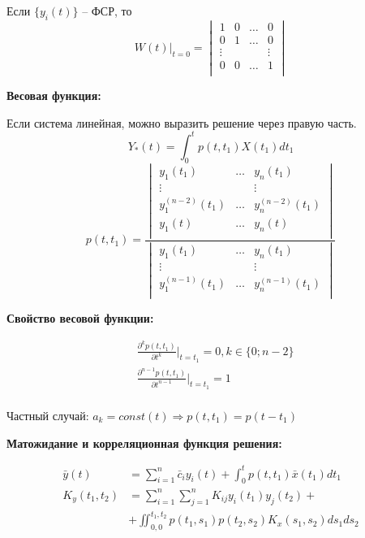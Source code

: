 \documentclass[a4paper,11pt, twocolumn]{article}
\begin{document}
Если $ \{ y_i(t) \} $ -- ФСР, то
\[ W(t)|_{t=0} = \begin{vmatrix}
    1 & 0 & \dots & 0 \\
    0 & 1 & \dots & 0 \\
    \vdots & & & \vdots \\
    0 & 0 & \dots & 1 \\
\end{vmatrix} \]

\textbf{ Весовая функция: }

Если система линейная, можно выразить решение через правую часть.
\[ Y_*(t) = \int_{0}^{t} p(t,t_1) X(t_1) d t_1 \]
\[ p(t, t_1) = \frac{\begin{vmatrix}
         y_1(t_1) & \dots & y_n(t_1) \\
        \vdots & & \vdots \\
        y_1^{(n-2)}(t_1) & \dots & y_n^{(n-2)}(t_1) \\
        y_1(t) & \dots & y_n(t) \\
\end{vmatrix}}{\begin{vmatrix}
        y_1(t_1) & \dots & y_n(t_1) \\
        \vdots & & \vdots \\
        y_1^{(n-1)}(t_1) & \dots & y_n^{(n-1)}(t_1) \\
\end{vmatrix}} \]

\textbf{ Свойство весовой функции: }

\begin{align*}
    & \frac{\partial^k p(t, t_1)}{\partial t^{k}}|_{t=t_1} = 0, k \in \{ 0; n-2 \} \\
    & \frac{\partial^{n-1} p(t, t_1)}{\partial t^{n-1}}|_{t=t_1} = 1 \\
\end{align*}

Частный случай: $ a_k = const(t) \Rightarrow p(t, t_1) = p(t-t_1) $

\textbf{ Матожидание и корреляционная функция решения: }

\begin{align*}
     \bar y(t) & = \sum_{i=1}^{n} \bar c_i y_i(t) + \int_{0}^{t} p(t, t_1) \bar x(t_1) d t_1 \\
    K_y(t_1, t_2) & = \sum_{i=1}^{n} \sum_{j=1}^{n} K_{ij} y_i(t_1) y_j(t_2) + \\
    & + \iint_{0,0}^{t_1, t_2} p(t_1, s_1) p(t_2, s_2) K_x(s_1, s_2) d s_1 d s_2
\end{align*}
\end{document}
